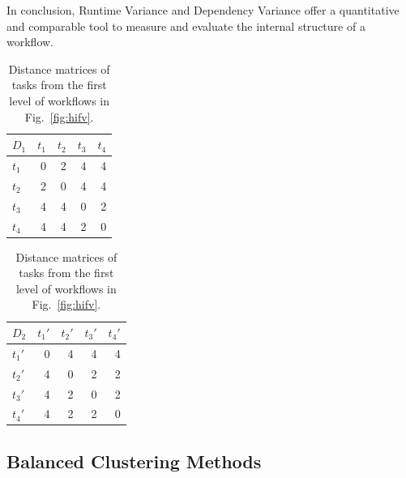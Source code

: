 \documentclass[final]{IEEEtran}
\begin{document}
In conclusion, Runtime Variance and Dependency Variance offer a quantitative and comparable tool to measure and evaluate the internal structure of a workflow. 



\begin{table}[htb]
	\footnotesize
	\centering
	\begin{tabular}{l|rrrr}
		$D_1$ & $t_1$ & $t_2$ & $t_3$ &$t_4$\\
		\hline
		$t_1$ & 0 & 2 & 4 & 4 \\
		$t_2$ & 2 & 0 & 4 & 4 \\
		$t_3$ & 4 & 4 & 0 & 2\\
		$t_4$ & 4 & 4 & 2 & 0 \\
	\end{tabular}
	\quad
	\begin{tabular}{l|rrrr}
		$D_2$ & $t_1'$ & $t_2'$ & $t_3'$ &$t_4'$\\
		\hline
		$t_1'$ & 0 & 4 & 4 & 4 \\
		$t_2'$ & 4 & 0 & 2 & 2 \\
		$t_3'$ & 4 & 2 & 0 & 2\\
		$t_4'$ & 4 & 2 & 2 & 0 \\
	\end{tabular}
	\caption{Distance matrices of tasks from the first level of workflows in Fig.~\ref{fig:hifv}.}
	\label{tab:1}
	\vspace{-15pt}
\end{table}


\subsection{Balanced Clustering Methods}
\end{document}
